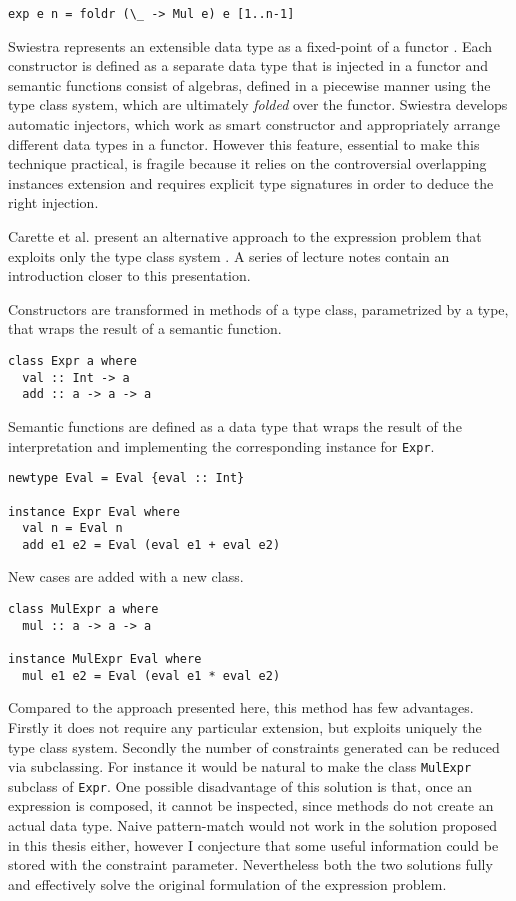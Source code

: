 \documentclass[../Thesis.tex]{subfiles}
\begin{document}
\begin{verbatim}
exp e n = foldr (\_ -> Mul e) e [1..n-1]
\end{verbatim}

Swiestra represents an extensible data type as a fixed-point of a functor \cite{Swierstra08DTL}. Each constructor is defined as a separate data type
that is injected in a functor and semantic functions consist of algebras,
defined in a piecewise manner using the type class system, which are ultimately \emph{folded} over the functor.
Swiestra develops automatic injectors, which work as smart constructor
and appropriately arrange different data types in a functor.
However this feature, essential to make this technique practical, is fragile because it relies on the controversial overlapping instances extension and requires explicit type signatures in order to deduce the right injection.

Carette et al.  present an alternative approach to the expression problem that exploits only the type class system \cite{Carette09FTP}. A series of lecture notes \cite{Oleg12FTP} contain an introduction closer to this presentation.

Constructors are transformed in methods of a type class, parametrized by a type, that wraps the result of a semantic function.

\begin{verbatim}
class Expr a where
  val :: Int -> a
  add :: a -> a -> a
\end{verbatim}

Semantic functions are defined as a data type that wraps the result of
the interpretation and implementing the corresponding 
instance for \texttt{Expr}.

\begin{verbatim}
newtype Eval = Eval {eval :: Int}

instance Expr Eval where
  val n = Eval n
  add e1 e2 = Eval (eval e1 + eval e2)
\end{verbatim}

New cases are added with a new class.

\begin{verbatim}
class MulExpr a where
  mul :: a -> a -> a

instance MulExpr Eval where
  mul e1 e2 = Eval (eval e1 * eval e2)
\end{verbatim}

Compared to the approach presented here, this method has few advantages.
Firstly it does not require any particular extension, but exploits uniquely 
the type class system. Secondly the number of constraints generated can be
reduced via subclassing. For instance it would be natural to make the class
\texttt{MulExpr} subclass of \texttt{Expr}.
One possible disadvantage of this solution is that, once an expression is composed, it cannot be inspected, since methods do not create an actual data type. Naive pattern-match would not work in the solution proposed in this
thesis either, however I conjecture that some useful information could be stored with the constraint parameter. 
Nevertheless both the two solutions fully and effectively solve the original formulation of the expression problem.
\end{document}
